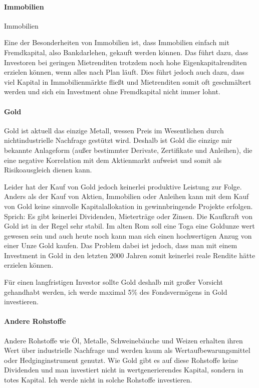 \documentclass{article}
\begin{document}
\paragraph{Immobilien}

Immobilien 

Eine der Besonderheiten von Immobilien ist, dass Immobilien einfach mit Fremdkapital, also Bankdarlehen, gekauft werden können. Das führt dazu, dass Investoren bei geringen Mietrenditen trotzdem noch hohe Eigenkapitalrenditen erzielen können, wenn alles nach Plan läuft. Dies führt jedoch auch dazu, dass viel Kapital in Immobilienmärkte fließt und Mietrenditen somit oft geschmältert werden und sich ein Investment ohne Fremdkapital nicht immer lohnt. 

\paragraph{Gold}

Gold ist aktuell das einzige Metall, wessen Preis im Wesentlichen durch nichtindustrielle Nachfrage gestützt wird. Deshalb ist Gold die einzige mir bekannte Anlageform (außer bestimmter Derivate, Zertifikate und Anleihen), die eine negative Korrelation mit dem Aktienmarkt aufweist und somit als Risikoausgleich dienen kann.

Leider hat der Kauf von Gold jedoch keinerlei produktive Leistung zur Folge. Anders als der Kauf von Aktien, Immobilien oder Anleihen kann mit dem Kauf von Gold keine sinnvolle Kapitalallokation in gewinnbringende Projekte erfolgen. Sprich: Es gibt keinerlei Dividenden, Mieterträge oder Zinsen. Die Kaufkraft von Gold ist in der Regel sehr stabil. Im alten Rom soll eine Toga eine Goldunze wert gewesen sein und auch heute noch kann man sich einen hochwertigen Anzug von einer Unze Gold kaufen. Das Problem dabei ist jedoch, dass man mit einem Investment in Gold in den letzten 2000 Jahren somit keinerlei reale Rendite hätte erzielen können.

Für einen langfristigen Investor sollte Gold deshalb mit großer Vorsicht gehandhabt werden, ich werde maximal 5\% des Fondsvermögens in Gold investieren.

\paragraph{Andere Rohstoffe}

Andere Rohstoffe wie Öl, Metalle, Schweinebäuche und Weizen erhalten ihren Wert über industrielle Nachfrage und werden kaum als Wertaufbewarungsmittel oder Hedginginstrument genutzt. Wie Gold gibt es auf diese Rohstoffe keine Dividenden und man investiert nicht in wertgenerierendes Kapital, sondern in totes Kapital. Ich werde nicht in solche Rohstoffe investieren. 
\end{document}
